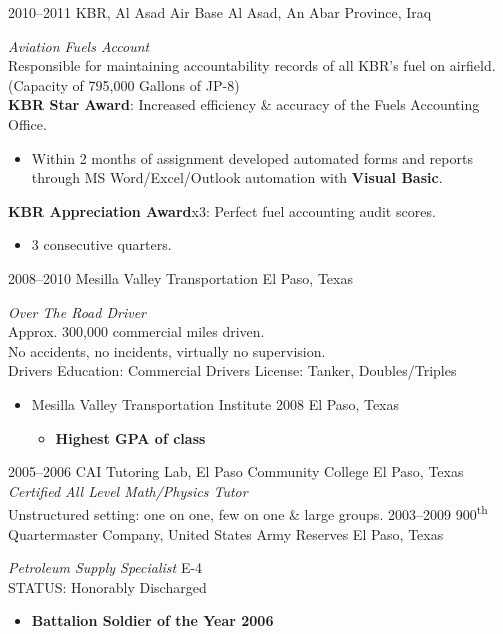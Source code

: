 \documentclass[]{friggeri-cv} %
\begin{document}
\begin{entrylist}
\entry
{2010--2011}
{KBR, Al Asad Air Base}
{Al Asad, An Abar Province, Iraq}
{\emph{Aviation Fuels Account} \\
Responsible for maintaining accountability records of all KBR's fuel on airfield. 
(Capacity of 795,000 Gallons of JP-8) \\
\textbf{KBR Star Award}: Increased efficiency \& accuracy of the Fuels Accounting Office.
\begin{itemize}
\item Within 2 months of assignment developed automated forms and reports through MS Word/Excel/Outlook automation with \textbf{Visual Basic}.
\end{itemize}
\textbf{KBR Appreciation Award}x3: Perfect fuel accounting audit scores.
\begin{itemize}
\item 3 consecutive quarters.
\end{itemize}}
\entry
{2008--2010}
{Mesilla Valley Transportation}
{El Paso, Texas}
{\emph{Over The Road Driver} \\
Approx. 300,000 commercial miles driven. \\
No accidents, no incidents, virtually no supervision. \\
Drivers Education: Commercial Drivers License: Tanker, Doubles/Triples
\begin{itemize}
\item Mesilla Valley Transportation Institute 2008 El Paso, Texas
\begin{itemize}
\item \textbf{Highest GPA of class}
\end{itemize}
\end{itemize}}
\entry
{2005--2006}
{CAI Tutoring Lab, El Paso Community College}
{El Paso, Texas}
{\emph{Certified All Level Math/Physics Tutor} \\
Unstructured setting: one on one, few on one \& large groups.}
\entry
{2003--2009}
{900\textsuperscript{th} Quartermaster Company, United States Army Reserves}
{El Paso, Texas}
{\emph{Petroleum Supply Specialist} E-4 \\ 
STATUS: Honorably Discharged
\begin{itemize}
\item \textbf{Battalion Soldier of the Year 2006}

\end{itemize}}
\end{entrylist}
\end{document}
